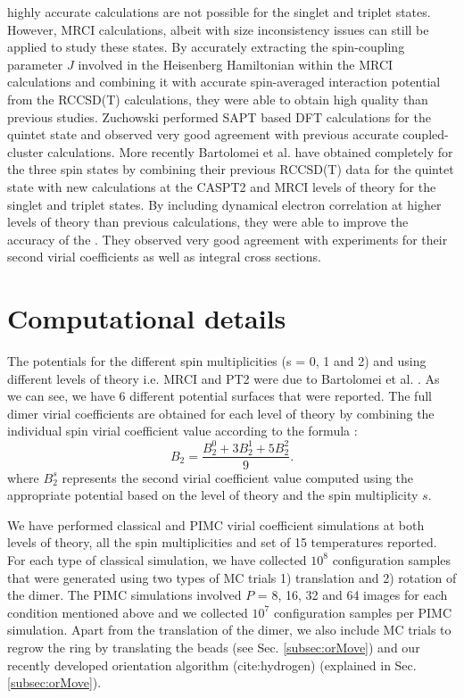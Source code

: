 highly accurate calculations are not possible for the singlet and triplet states. However, MRCI calculations, albeit with size inconsistency issues can still be applied to study these states. By accurately extracting the spin-coupling parameter $J$ involved in the Heisenberg Hamiltonian within the MRCI calculations and combining it with accurate spin-averaged interaction potential from the RCCSD(T) calculations, they were able to obtain high quality \PESs{} than previous studies. Zuchowski \cite{Zuchowski2008} performed SAPT based DFT calculations for the quintet state and observed very good agreement with previous accurate \abinitio{} coupled-cluster calculations. More recently Bartolomei et al. \cite{Bartolomei2010} have obtained completely \abinitio{} \PESs{} for the three spin states by combining their previous RCCSD(T) data \cite{Bartolomei2008} for the quintet state with new \abinitio{} calculations at the CASPT2 and MRCI levels of theory for the singlet and triplet states. By including dynamical electron correlation at higher levels of theory than previous calculations, they were able to improve the accuracy of the \PESs{}. They observed very good agreement with experiments for their second virial coefficients as well as integral cross sections.
\section{Computational details}
    The \abinitio{} potentials for the different spin multiplicities (s = 0, 1 and 2) and using different levels of theory i.e. MRCI and PT2 were due to Bartolomei et al. \cite{Bartolomei2010}. As we can see, we have 6 different potential surfaces that were reported. The full dimer virial coefficients are obtained for each level of theory by combining the individual spin virial coefficient value according to the formula \cite{Aquilanti1999,Bartolomei2010}:
    \begin{equation}
        B_2 = \frac{B_2^0 + 3 B_2^1 + 5 B_2^2}{9}.
    \end{equation}
    where $B_2^s$ represents the second virial coefficient value computed using the appropriate potential based on the level of theory and the spin multiplicity $s$.

    We have performed classical and PIMC virial coefficient simulations at both levels of theory, all the spin multiplicities and set of 15 temperatures reported. For each type of classical simulation, we have collected $10^8$ configuration samples that were generated using two types of MC trials 1) translation and 2) rotation of the dimer. The PIMC simulations involved $P$ = 8, 16, 32 and 64 images for each condition mentioned above and we collected $10^7$ configuration samples per PIMC simulation. Apart from the translation of the dimer, we also include MC trials to regrow the ring by translating the beads (see Sec. \ref{subsec:orMove}) and our recently developed orientation algorithm (cite:hydrogen) (explained in Sec. \ref{subsec:orMove}).

